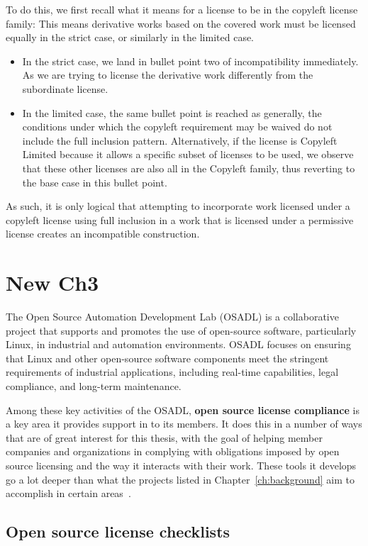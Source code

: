To do this, we first recall what it means for a license to be in the copyleft license family: This means derivative works based on the covered work must be licensed equally in the strict case, or similarly in the limited case.
\begin{itemize}
	\item In the strict case, we land in bullet point two of incompatibility immediately. As we are trying to license the derivative work differently from the subordinate license.
	\item In the limited case, the same bullet point is reached as generally, the conditions under which the copyleft requirement may be waived do not include the full inclusion pattern. Alternatively, if the license is Copyleft Limited because it allows a specific subset of licenses to be used, we observe that these other licenses are also all in the Copyleft family, thus reverting to the base case in this bullet point.
\end{itemize}

As such, it is only logical that attempting to incorporate work licensed under a copyleft license using full inclusion in a work that is licensed under a permissive license creates an incompatible construction.

\chapter{New Ch3}

The Open Source Automation Development Lab (OSADL) is a collaborative project that supports and promotes the use of open-source software, particularly Linux, in industrial and automation environments. OSADL focuses on ensuring that Linux and other open-source software components meet the stringent requirements of industrial applications, including real-time capabilities, legal compliance, and long-term maintenance.

Among these key activities of the OSADL, \textbf{open source license compliance} is a key area it provides support in to its members. It does this in a number of ways that are of great interest for this thesis, with the goal of helping member companies and organizations in complying with obligations imposed by open source licensing and the way it interacts with their work. These tools it develops go a lot deeper than what the projects listed in Chapter~\ref{ch:background} aim to accomplish in certain areas~\cite{osadl-home}.

\section{Open source license checklists}

